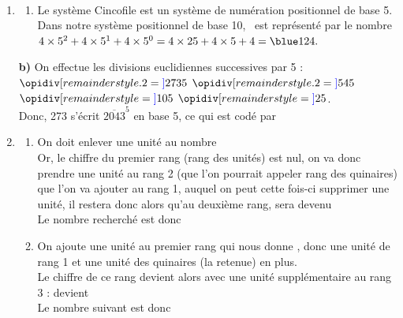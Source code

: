 \begin{corrige}
\ \\ [-5mm]
   \begin{enumerate}
      \item 
      \begin{enumerate}
         \item Le système Cincofile est un système de numération positionnel de base 5. \\
         Dans notre système positionnel de base 10, \,    est représenté par le nombre $4\times5^2+4\times5^1+4\times5^0 =4\times25+4\times5+4 ={\blue 124}.$
      \end{enumerate}
   \textcolor{G1}{\bf b)} On effectue les divisions euclidiennes successives par 5 : \\
      $\opidiv[remainderstyle.2=\textcolor{blue}]{273}{5}$ \quad $\opidiv[remainderstyle.2=\textcolor{blue}]{54}{5}$ \quad $\opidiv[remainderstyle=\textcolor{blue}]{10}{5}$ \quad $\opidiv[remainderstyle=\textcolor{blue}]{2}{5}$. \\ [1mm]
      Donc, 273 s'écrit $\overline{2043}^5$ en base 5, ce qui est codé par \, {\blue{}   } \\
      \setcounter{enumi}{1}
      \item
      \begin{enumerate}
          \item On doit enlever une unité au nombre    \\
            Or, le chiffre du premier rang (rang des unités) est nul, on va donc \og prendre \fg{} une unité au rang 2 (que l'on pourrait appeler rang des quinaires) que l'on va ajouter au rang 1, auquel on peut cette fois-ci supprimer une unité, il restera donc  alors qu'au deuxième rang,  sera devenu  \\
Le nombre recherché est donc {\blue {}  }
            \item On ajoute une unité au premier rang  qui nous donne  \fg, donc une unité de rang 1 et une unité des quinaires (la retenue) en plus. \\
            Le chiffre de ce rang devient alors  avec une unité supplémentaire au rang 3 :  devient  \\
            Le nombre suivant \og {}   \fg{} est donc {\blue {}  }
      \end{enumerate}
   \end{enumerate}
\end{corrige}


